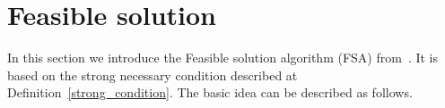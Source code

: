         










\section{Feasible solution} \label{section_feasible_solution}
In this section we introduce the Feasible solution algorithm (FSA) from~\cite{hawkins:1994}.
It is based on the strong necessary condition described at Definition~\ref{strong_condition}. 
The basic idea can be described as follows.

